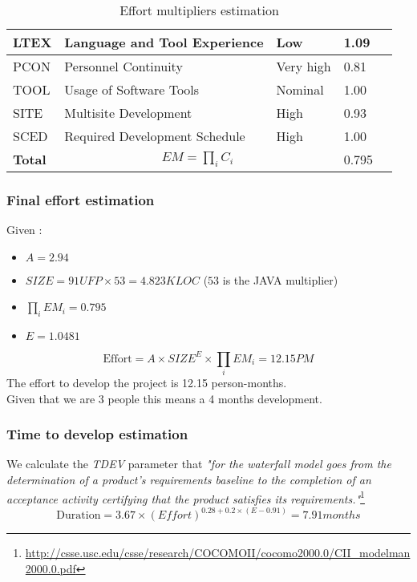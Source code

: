 \begin{table}[!htbp]
\begin{tabular}{| l | l | l | l | l |}
        \hline
        LTEX            & Language and Tool Experience              & Low                  & 1.09              \\
        \hline
        PCON            & Personnel Continuity                      & Very high            & 0.81              \\
        \hline
        TOOL            & Usage of Software Tools                   & Nominal              & 1.00              \\
        \hline
        SITE            & Multisite Development                     & High                 & 0.93              \\
        \hline
        SCED            & Required Development Schedule             & High                 & 1.00              \\
        \hline
        \textbf{Total}  & \multicolumn{2}{|c|}{$EM=\prod_i C_i$}                              & 0.795             \\
        \hline
    \end{tabular}
    \caption{Effort multipliers estimation}
    \label{tab:cost-drivers}
\end{table}

\subsubsection{Final effort estimation}
\label{sub:effort_estimation}
Given :
\begin{itemize}
	\item $A = 2.94$
	\item $SIZE = 91UFP  \times  53  = 4.823  KLOC$ ($53$ is the JAVA multiplier)
	\item $\prod_i EM_i = 0.795$
	\item $E = 1.0481$
\end{itemize}

\begin{equation}
    \textrm{Effort} = A \times SIZE^E \times \prod_i EM_i = 12.15 PM
    \label{eq:effort}
\end{equation}
The effort to develop the project is 12.15 person-months.\\
Given that we are 3 people this means a 4 months development. 

\subsubsection{Time to develop estimation}
\label{sub:time_to_develop}
We calculate the \emph{TDEV} parameter that \emph{"for the waterfall model goes from the determination of a product's requirements baseline to the completion of an acceptance activity certifying that the product satisfies its requirements."}\footnote{\url{http://csse.usc.edu/csse/research/COCOMOII/cocomo2000.0/CII_modelman2000.0.pdf}}
\begin{equation}
    \textrm{Duration} = 3.67 \times (Effort)^{0.28 + 0.2 \times (E-0.91)} = 7.91 months
    \label{eq:duration}
\end{equation}
